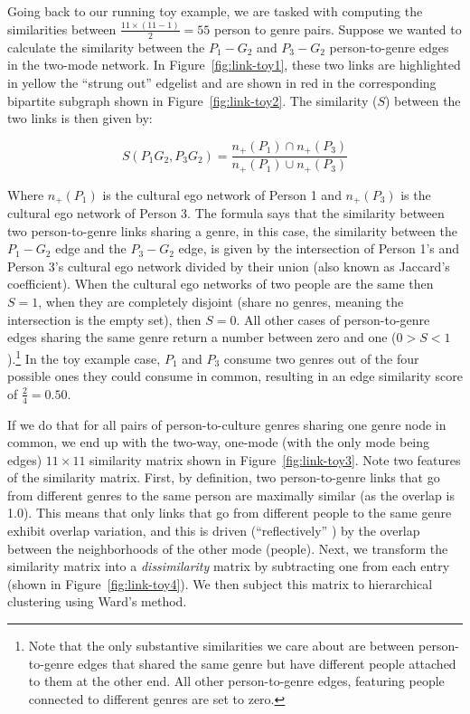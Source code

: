 \documentclass[a4paper,12pt]{extarticle}
\begin{document}
Going back to our running toy example, we are tasked with computing the similarities between $\frac{11 \times (11-1)}{2} = 55$ person to genre pairs. Suppose we wanted to calculate the similarity between the $P_1-G_2$ and $P_3-G_2$ person-to-genre edges in the two-mode network. In Figure~\ref{fig:link-toy1}, these two links are highlighted in yellow the ``strung out'' edgelist and are shown in red in the corresponding bipartite subgraph shown in Figure~\ref{fig:link-toy2}. The similarity ($S$) between the two links is then given by:

\begin{equation}
    S(P_1G_2, P_3G_2) = \frac{n_+(P_1) \cap n_+(P_3)}{n_+(P_1) \cup n_+(P_3)}
\end{equation}

Where $n_+(P_1)$ is the cultural ego network of Person 1 and $n_+(P_3)$ is the cultural ego network of Person 3. The formula says that the similarity between two person-to-genre links sharing a genre, in this case, the similarity between the $P_1-G_2$ edge and the $P_3-G_2$ edge, is given by the intersection of Person 1's and Person 3's cultural ego network divided by their union (also known as Jaccard's coefficient). When the cultural ego networks of two people are the same then $S=1$, when they are completely disjoint (share no genres, meaning the intersection is the empty set), then $S = 0$. All other cases of person-to-genre edges sharing the same genre return a number between zero and one ($0 > S < 1$).\footnote{Note that the only substantive similarities we care about are between person-to-genre edges that shared the same genre but have different people attached to them at the other end. All other person-to-genre edges, featuring people connected to different genres are set to zero.} In the toy example case, $P_1$ and $P_3$ consume two genres out of the four possible ones they could consume in common, resulting in an edge similarity score of $\frac{2}{4} = 0.50$. 

If we do that for all pairs of person-to-culture genres sharing one genre node in common, we end up with the two-way, one-mode (with the only mode being edges) $11 \times 11$ similarity matrix shown in Figure~\ref{fig:link-toy3}. Note two features of the similarity matrix. First, by definition, two person-to-genre links that go from different genres to the same person are maximally similar (as the overlap is 1.0). This means that only links that go from different people to the same genre exhibit overlap variation, and this is driven (``reflectively'' \citep{lizardo18}) by the overlap between the neighborhoods of the other mode (people). Next, we transform the similarity matrix into a {\em dissimilarity} matrix by subtracting one from each entry (shown in  Figure~\ref{fig:link-toy4}). We then subject this matrix to hierarchical clustering using Ward's \citeyearpar{ward63} method. 
\end{document}
